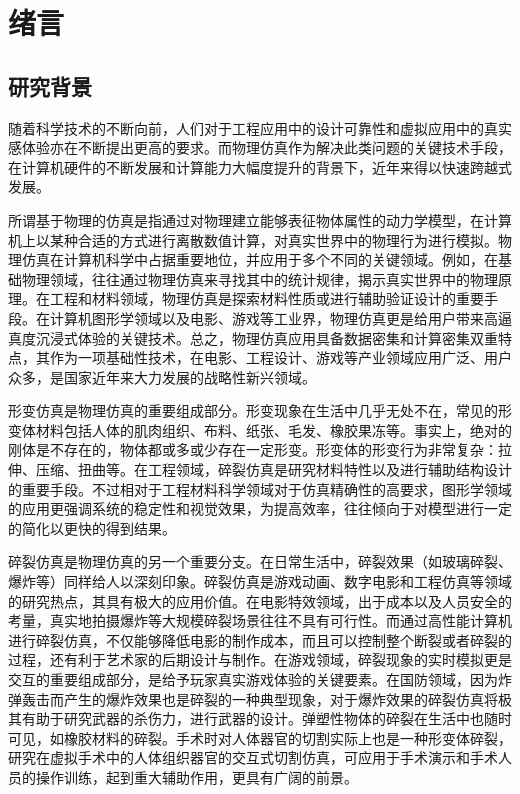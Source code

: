 \chapter{绪言}
\label{chap1_introduction}
\section{研究背景}
随着科学技术的不断向前，人们对于工程应用中的设计可靠性和虚拟应用中的真实感体验亦在不断提出更高的要求。而物理仿真作为解决此类问题的关键技术手段，在计算机硬件的不断发展和计算能力大幅度提升的背景下，近年来得以快速跨越式发展。

所谓基于物理的仿真是指通过对物理建立能够表征物体属性的动力学模型，在计算机上以某种合适的方式进行离散数值计算，对真实世界中的物理行为进行模拟。物理仿真在计算机科学中占据重要地位，并应用于多个不同的关键领域。例如，在基础物理领域，往往通过物理仿真来寻找其中的统计规律，揭示真实世界中的物理原理。在工程和材料领域，物理仿真是探索材料性质或进行辅助验证设计的重要手段。在计算机图形学领域以及电影、游戏等工业界，物理仿真更是给用户带来高逼真度沉浸式体验的关键技术。总之，物理仿真应用具备数据密集和计算密集双重特点，其作为一项基础性技术，在电影、工程设计、游戏等产业领域应用广泛、用户众多，是国家近年来大力发展的战略性新兴领域。

形变仿真是物理仿真的重要组成部分。形变现象在生活中几乎无处不在，常见的形变体材料包括人体的肌肉组织、布料、纸张、毛发、橡胶果冻等。事实上，绝对的刚体是不存在的，物体都或多或少存在一定形变。形变体的形变行为非常复杂：拉伸、压缩、扭曲等。在工程领域，碎裂仿真是研究材料特性以及进行辅助结构设计的重要手段。不过相对于工程材料科学领域对于仿真精确性的高要求，图形学领域的应用更强调系统的稳定性和视觉效果，为提高效率，往往倾向于对模型进行一定的简化以更快的得到结果。

碎裂仿真是物理仿真的另一个重要分支。在日常生活中，碎裂效果（如玻璃碎裂、爆炸等）同样给人以深刻印象。碎裂仿真是游戏动画、数字电影和工程仿真等领域的研究热点，其具有极大的应用价值。在电影特效领域，出于成本以及人员安全的考量，真实地拍摄爆炸等大规模碎裂场景往往不具有可行性。而通过高性能计算机进行碎裂仿真，不仅能够降低电影的制作成本，而且可以控制整个断裂或者碎裂的过程，还有利于艺术家的后期设计与制作。在游戏领域，碎裂现象的实时模拟更是交互的重要组成部分，是给予玩家真实游戏体验的关键要素。在国防领域，因为炸弹轰击而产生的爆炸效果也是碎裂的一种典型现象，对于爆炸效果的碎裂仿真将极其有助于研究武器的杀伤力，进行武器的设计。弹塑性物体的碎裂在生活中也随时可见，如橡胶材料的碎裂。手术时对人体器官的切割实际上也是一种形变体碎裂，研究在虚拟手术中的人体组织器官的交互式切割仿真，可应用于手术演示和手术人员的操作训练，起到重大辅助作用，更具有广阔的前景。

